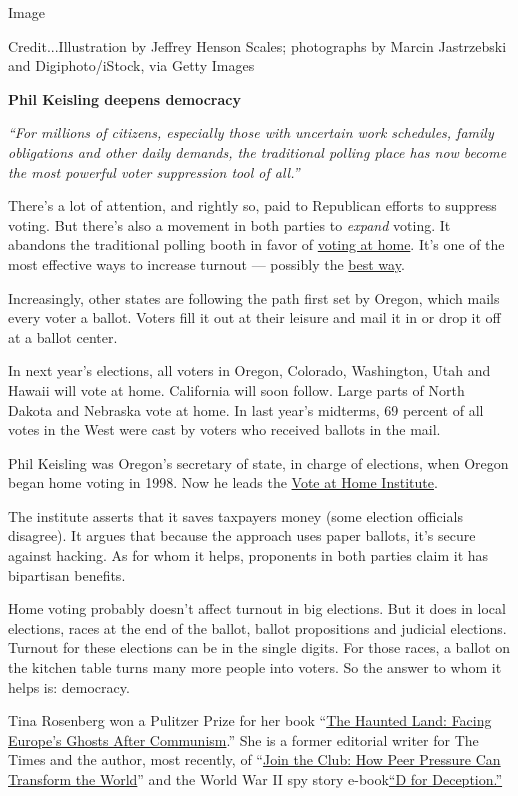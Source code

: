 Image

Credit...Illustration by Jeffrey Henson Scales; photographs by Marcin
Jastrzebski and Digiphoto/iStock, via Getty Images

\textbf{Phil Keisling deepens democracy}

\emph{``For millions of citizens, especially those with uncertain work
schedules, family obligations and other daily demands, the traditional
polling place has now become the most powerful voter suppression tool of
all.''}

There's a lot of attention, and rightly so, paid to Republican efforts
to suppress voting. But there's also a movement in both parties to
\emph{expand} voting. It abandons the traditional polling booth in favor
of
\href{https://www.nytimes3xbfgragh.onion/2019/06/11/opinion/the-end-of-the-polling-booth.html}{voting
at home}. It's one of the most effective ways to increase turnout ---
possibly the
\href{https://www.voteathome.org/project/proven-track-record/}{best
way}.

Increasingly, other states are following the path first set by Oregon,
which mails every voter a ballot. Voters fill it out at their leisure
and mail it in or drop it off at a ballot center.

In next year's elections, all voters in Oregon, Colorado, Washington,
Utah and Hawaii will vote at home. California will soon follow. Large
parts of North Dakota and Nebraska vote at home. In last year's
midterms, 69 percent of all votes in the West were cast by voters who
received ballots in the mail.

Phil Keisling was Oregon's secretary of state, in charge of elections,
when Oregon began home voting in 1998. Now he leads the
\href{http://www.voteathome.org}{Vote at Home Institute}.

The institute asserts that it saves taxpayers money (some election
officials disagree). It argues that because the approach uses paper
ballots, it's secure against hacking. As for whom it helps, proponents
in both parties claim it has bipartisan benefits.

Home voting probably doesn't affect turnout in big elections. But it
does in local elections, races at the end of the ballot, ballot
propositions and judicial elections. Turnout for these elections can be
in the single digits. For those races, a ballot on the kitchen table
turns many more people into voters. So the answer to whom it helps is:
democracy.

Tina Rosenberg won a Pulitzer Prize for her book
``\href{http://www.randomhouse.com/catalog/display.pperl?isbn=9780679744993}{The
Haunted Land: Facing Europe's Ghosts After Communism}.'' She is a former
editorial writer for The Times and the author, most recently, of
``\href{http://books.wwnorton.com/books/Join-the-Club}{Join the Club:
How Peer Pressure Can Transform the World}'' and the World War II spy
story
e-book\href{https://www.goodreads.com/book/show/16124470-d-for-deception}{``D
for Deception.''}

